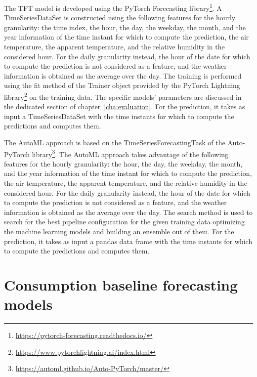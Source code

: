 The TFT model is developed using the PyTorch Forecasting library\footnote{ \url{https://pytorch-forecasting.readthedocs.io/} }.
A TimeSeriesDataSet is constructed using the following features for the hourly granularity: the time index, the hour, the day, the weekday, the month, and the year information of the time instant for which to compute the prediction, the air temperature, the apparent temperature, and the relative humidity in the considered hour.
For the daily granularity instead, the hour of the date for which to compute the prediction is not considered as a feature, and the weather information is obtained as the average over the day.
The training is performed using the fit method of the Trainer object provided by the PyTorch Lightning library\footnote{ \url{https://www.pytorchlightning.ai/index.html} } on the training data.
The specific models' parameters are discussed in the dedicated section of chapter~\ref{cha:evaluation}.
For the prediction, it takes as input a TimeSeriesDataSet with the time instants for which to compute the predictions and computes them.

The AutoML approach is based on the TimeSeriesForecastingTask of the Auto-PyTorch library\footnote{ \url{https://automl.github.io/Auto-PyTorch/master/} }.
The AutoML approach takes advantage of the following features for the hourly granularity: the hour, the day, the weekday, the month, and the year information of the time instant for which to compute the prediction, the air temperature, the apparent temperature, and the relative humidity in the considered hour.
For the daily granularity instead, the hour of the date for which to compute the prediction is not considered as a feature, and the weather information is obtained as the average over the day.
The search method is used to search for the best pipeline configuration for the given training data optimizing the machine learning models and building an ensemble out of them.
For the prediction, it takes as input a pandas data frame with the time instants for which to compute the predictions and computes them.


\section{Consumption baseline forecasting models}
\label{sec:baselineimpl}
\vspace{0.2 cm}

